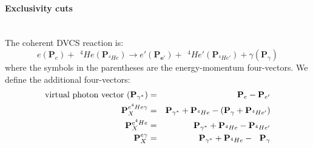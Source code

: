 \newpage
\paragraph{Exclusivity cuts} ~\\
The coherent DVCS reaction is:
\begin{equation}
e(\mathbf{P}_{e}) + ~~^{4}He(\mathbf{P}_{^{4}He}) \rightarrow 
e'(\mathbf{P_{e'}}) +  ~~^{4}He'(\mathbf{P}_{^{4}He'}) + 
\gamma(\mathbf{P}_{\gamma})
\label{coh_dvcs_equ}
\end{equation}
where the symbols in the parentheses are the energy-momentum four-vectors. We define the additional four-vectors:
\begin{eqnarray}
\text{virtual photon vector } (\mathbf{P}_{\gamma^{*}}) &=&  \mathbf{P}_{e} -  \mathbf{P}_{e'} \\
\hspace{0.4in}  \mathbf{P}^{e^{4}He\gamma}_{X} &=& \mathbf{P}_{\gamma^{*}} + \mathbf{P}_{^{4}He} - (\mathbf{P}_{\gamma} + \mathbf{P}_{^{4}He'})\\
~~~~~~~~~~\mathbf{P}^{e^{4}He}_{X} &=& \mathbf{P}_{\gamma^{*}} + \mathbf{P}_{^{4}He} -  \mathbf{P}_{^{4}He'} \\
\hspace{0.2in} \mathbf{P}^{e\gamma}_{X} &=& \mathbf{P}_{\gamma^{*}} + \mathbf{P}_{^{4}He} - ~~\mathbf{P}_{\gamma}
\end{eqnarray}

